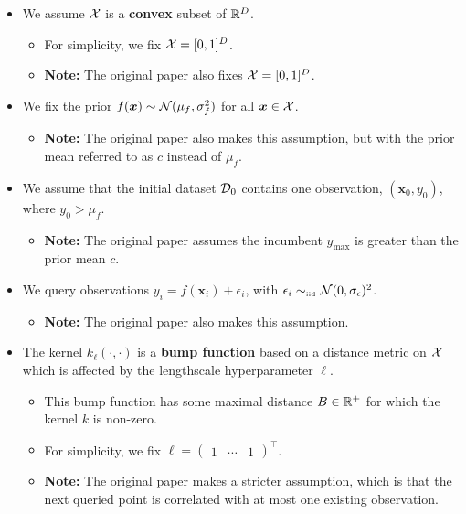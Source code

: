 \documentclass[11pt]{article}
\numberwithin{figure}{section}
\numberwithin{equation}{section}
\newcommand{\bs}[1]{\boldsymbol{#1}}
\def\bsx{\bs{x}}
\def\bell{\bs{\ell}}
\begin{document}
\begin{itemize}[label=]

  \item We assume $\mathcal{X}$ is a \textbf{convex} subset of $\mathbb{R}^{D}$.
  \begin{itemize}[label=]
    \item For simplicity, we fix $\mathcal{X} = [0, 1]^{D}$.
    \item \textbf{Note:} The original paper also fixes $\mathcal{X} = [0, 1]^{D}$. 
  \end{itemize}

  \item We fix the prior $f(\bsx) \sim \calN(\mu_{f}, \sigma_{f}^{2})$ for all $\bsx \in \calX$.
  \begin{itemize}[label=]
    \item \textbf{Note:} The original paper also makes this assumption, but with the prior mean referred to as $c$ instead of $\mu_{f}$.
  \end{itemize}

  \item We assume that the initial dataset $\mathcal{D}_{0}$ contains one observation, $\left(\bsx_{0}, y_{0}\right)$, where $y_{0} > \mu_{f}$.
  \begin{itemize}[label=]
    \item \textbf{Note:} The original paper assumes the incumbent $y_{\text{max}}$ is greater than the prior mean $c$. 
  \end{itemize}

  \item We query observations $y_{i} = f(\bsx_{i}) + \epsilon_{i}$, with $\epsilon_{i} \sim_{\mbox{\tiny \textrm{iid}}} \mathcal{N}(0, \sigma_{\epsilon})^{2}$.
  \begin{itemize}[label=]
    \item \textbf{Note:} The original paper also makes this assumption.
  \end{itemize}

  \item The kernel $k_{\bell}(\cdot, \cdot)$ is a \textbf{bump function} based on a distance metric on $\mathcal{X}$ which is affected by the lengthscale hyperparameter $\bell$.
  \begin{itemize}[label=]
    \item This bump function has some maximal distance $B \in \mathbb{R}^{+}$ for which the kernel $k$ is non-zero. 
    \item For simplicity, we fix $\bell = \begin{pmatrix}1 & \cdots & 1 
    \end{pmatrix}^{\top}$.
    \item \textbf{Note:} The original paper makes a stricter assumption, which is that the next queried point is correlated with at most one existing observation.
  \end{itemize}


\end{itemize}
\end{document}
